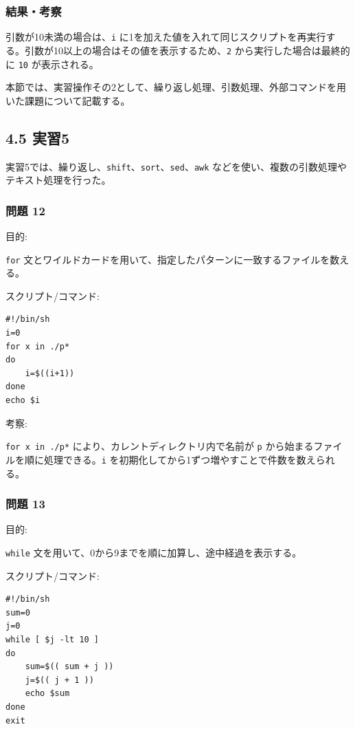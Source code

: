 \documentclass[12pt,a4paper]{jsarticle}
\begin{document}
\subsubsection*{結果・考察}
引数が10未満の場合は、\texttt{i} に1を加えた値を入れて同じスクリプトを再実行する。引数が10以上の場合はその値を表示するため、\texttt{2} から実行した場合は最終的に \texttt{10} が表示される。

\vspace{1.0cm}

\newpage

本節では、実習操作その2として、繰り返し処理、引数処理、外部コマンドを用いた課題について記載する。\par
\vspace{0.5cm}

\subsection*{4.5 実習5}
実習5では、繰り返し、\texttt{shift}、\texttt{sort}、\texttt{sed}、\texttt{awk} などを使い、複数の引数処理やテキスト処理を行った。

\subsubsection*{問題 12}
目的:\par
\texttt{for} 文とワイルドカードを用いて、指定したパターンに一致するファイルを数える。

スクリプト/コマンド:\par
\begin{lstlisting}
#!/bin/sh
i=0
for x in ./p*
do
    i=$((i+1))
done
echo $i
\end{lstlisting}

考察:\par
\texttt{for x in ./p*} により、カレントディレクトリ内で名前が \texttt{p} から始まるファイルを順に処理できる。\texttt{i} を初期化してから1ずつ増やすことで件数を数えられる。

\vspace{0.7cm}

\subsubsection*{問題 13}
目的:\par
\texttt{while} 文を用いて、0から9までを順に加算し、途中経過を表示する。

スクリプト/コマンド:\par
\begin{lstlisting}
#!/bin/sh
sum=0
j=0
while [ $j -lt 10 ]
do
    sum=$(( sum + j ))
    j=$(( j + 1 ))
    echo $sum
done
exit
\end{lstlisting}
\end{document}
